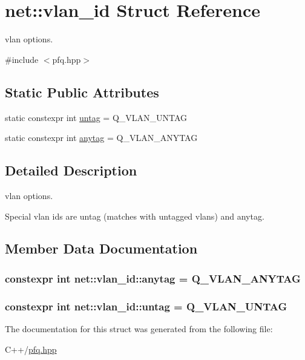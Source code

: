 \hypertarget{structnet_1_1vlan__id}{\section{net\+:\+:vlan\+\_\+id Struct Reference}
\label{structnet_1_1vlan__id}
}


vlan options.  




{\ttfamily \#include $<$pfq.\+hpp$>$}

\subsection*{Static Public Attributes}
\begin{DoxyCompactItemize}
\item 
static constexpr int \hyperlink{structnet_1_1vlan__id_a266d270ff167bffcc68b5baf3fa1254f}{untag} = Q\+\_\+\+V\+L\+A\+N\+\_\+\+U\+N\+T\+A\+G
\item 
static constexpr int \hyperlink{structnet_1_1vlan__id_a020dfecb6821c57a45437f534256d712}{anytag} = Q\+\_\+\+V\+L\+A\+N\+\_\+\+A\+N\+Y\+T\+A\+G
\end{DoxyCompactItemize}


\subsection{Detailed Description}
vlan options. 

Special vlan ids are untag (matches with untagged vlans) and anytag. 

\subsection{Member Data Documentation}
\hypertarget{structnet_1_1vlan__id_a020dfecb6821c57a45437f534256d712}{
\subsubsection[{anytag}]{\setlength{\rightskip}{0pt plus 5cm}constexpr int net\+::vlan\+\_\+id\+::anytag = Q\+\_\+\+V\+L\+A\+N\+\_\+\+A\+N\+Y\+T\+A\+G\hspace{0.3cm}{\ttfamily [static]}}}\label{structnet_1_1vlan__id_a020dfecb6821c57a45437f534256d712}
\hypertarget{structnet_1_1vlan__id_a266d270ff167bffcc68b5baf3fa1254f}{
\subsubsection[{untag}]{\setlength{\rightskip}{0pt plus 5cm}constexpr int net\+::vlan\+\_\+id\+::untag = Q\+\_\+\+V\+L\+A\+N\+\_\+\+U\+N\+T\+A\+G\hspace{0.3cm}{\ttfamily [static]}}}\label{structnet_1_1vlan__id_a266d270ff167bffcc68b5baf3fa1254f}


The documentation for this struct was generated from the following file\+:\begin{DoxyCompactItemize}
\item 
C++/\hyperlink{pfq_8hpp}{pfq.\+hpp}\end{DoxyCompactItemize}
